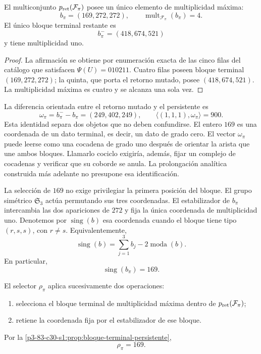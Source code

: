 \begin{proposition}
\label{p3-83-c30-s1:prop:bloque-terminal-persistente}
El multiconjunto \(p_{\rm ret}(\mathcal F_\pi)\) posee un único elemento de
multiplicidad máxima:
\[
b_\pi=(169,272,272),
\qquad
\operatorname{mult}_{\mathcal F_\pi}(b_\pi)=4.
\]
El único bloque terminal restante es
\[
b_\pi^-=(418,674,521)
\]
y tiene multiplicidad uno.
\end{proposition}

\begin{proof}
La afirmación se obtiene por enumeración exacta de las cinco filas del
catálogo que satisfacen \(\Psi(U)=010211\). Cuatro filas poseen bloque
terminal \((169,272,272)\); la quinta, que porta el retorno mutado, posee
\((418,674,521)\). La multiplicidad máxima es cuatro y se alcanza una sola
vez.
\end{proof}

La diferencia orientada entre el retorno mutado y el persistente es
\[
 \omega_\pi=b_\pi^- - b_\pi=(249,402,249),
 \qquad
 \langle(1,1,1),\omega_\pi\rangle=900.
\]
Esta identidad separa dos objetos que no deben confundirse. El entero
\(169\) es una coordenada de un dato terminal, es decir, un dato de grado
cero. El vector \(\omega_\pi\) puede leerse como una cocadena de grado uno
después de orientar la arista que une ambos bloques. Llamarlo cociclo exigiría,
además, fijar un complejo de cocadenas y verificar que su coborde se anula.
La prolongación analítica construida más adelante no presupone esa
identificación.

La selección de \(169\) no exige privilegiar la primera posición del bloque.
El grupo simétrico \(\mathfrak S_3\) actúa permutando sus tres coordenadas.
El estabilizador de \(b_\pi\) intercambia las dos apariciones de \(272\) y
fija la única coordenada de multiplicidad uno. Denotemos por
\(\operatorname{sing}(b)\) esa coordenada cuando el bloque tiene tipo
\((r,s,s)\), con \(r\ne s\). Equivalentemente,
\[
\operatorname{sing}(b)
=\sum_{j=1}^3b_j-2\operatorname{moda}(b).
\]
En particular,
\[
\boxed{\operatorname{sing}(b_\pi)=169.}
\]

\begin{definition}
\label{p3-83-c30-s1:def:selector-residual-pi}
El selector \(\rho_\pi\) aplica sucesivamente dos operaciones:
\begin{enumerate}
  \item selecciona el bloque terminal de multiplicidad máxima dentro de
  \(p_{\rm ret}(\mathcal F_\pi)\);
  \item retiene la coordenada fija por el estabilizador de ese bloque.
\end{enumerate}
Por la \cref{p3-83-c30-s1:prop:bloque-terminal-persistente},
\[
\boxed{\rho_\pi=169.}
\]
\end{definition}

